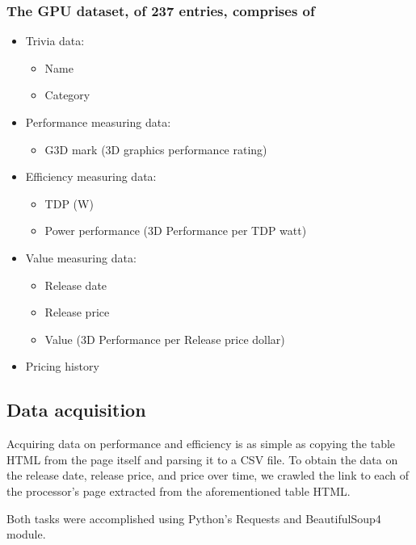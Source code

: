 \documentclass[conference]{IEEEtran}
\begin{document}
\subsubsection{The GPU dataset, of 237 entries, comprises of}
\begin{itemize}
	\item Trivia data:
	      \begin{itemize}
		      \item Name
		      \item Category
	      \end{itemize}
	\item Performance measuring data:
	      \begin{itemize}
		      \item G3D mark (3D graphics performance rating)
	      \end{itemize}
	\item Efficiency measuring data:
	      \begin{itemize}
		      \item TDP (W)
		      \item Power performance (3D Performance per TDP watt)
	      \end{itemize}
	\item Value measuring data:
	      \begin{itemize}
		      \item Release date
		      \item Release price
		      \item Value (3D Performance per Release price dollar)
	      \end{itemize}
	\item Pricing history
\end{itemize}

\subsection{Data acquisition}
Acquiring data on performance and efficiency is as simple as copying the
table HTML from the page itself and parsing it to a CSV file.
To obtain the data on the release date, release price, and price over time,
we crawled the link to each of the processor's page extracted from the
aforementioned table HTML.

Both tasks were accomplished using Python's Requests and BeautifulSoup4 module.
\end{document}

